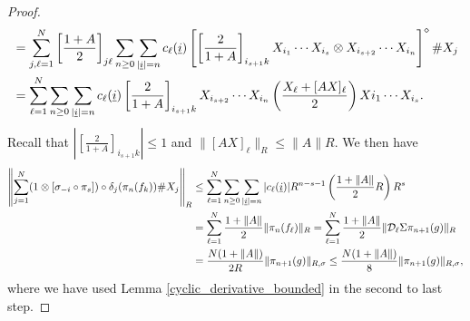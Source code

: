 \begin{proof}
\begin{align*}
			&=\sum_{j,\ell=1}^N \left[\frac{1+A}{2}\right]_{j\ell}\sum_{n\geq 0} \sum_{|\underline{i}|=n} c_\ell(\underline{i}) \left[ \left[\frac{2}{1+A}\right]_{i_{s+1}k}X_{i_1}\cdots X_{i_s}\otimes X_{i_{s+2}}\cdots X_{i_n}\right]^\diamond\# X_j\\
			&=\sum_{\ell=1}^N \sum_{n\geq 0} \sum_{|\underline{i}|=n} c_\ell(\underline{i}) \left[\frac{2}{1+A}\right]_{i_{s+1}k}X_{i_{s+2}}\cdots X_{i_n}\left(\frac{X_\ell+[AX]_{\ell}}{2}\right)X{i_1}\cdots X_{i_s}.
	\end{align*}
Recall that $\left|\left[\frac{2}{1+A}\right]_{i_{s+1}k}\right|\leq 1$ and $\|[AX]_\ell\|_R\leq \|A\| R$. We then have
	\begin{align*}
		\left\|\sum_{j=1}^N (1\otimes[\sigma_{-i}\circ\pi_s])\circ\delta_j(\pi_n(f_k))\# X_j\right\|_R &\leq \sum_{\ell=1}^N \sum_{n\geq 0} \sum_{|\underline{i}|=n} |c_\ell(\underline{i})| R^{n-s-1}\left(\frac{1+\|A\|}{2} R\right)R^s\\
			&=\sum_{\ell=1}^N \frac{1+\|A\|}{2} \|\pi_n(f_\ell)\|_R =\sum_{\ell=1}^N \frac{1+\|A\|}{2} \|\mathcal D_\ell \Sigma \pi_{n+1}(g)\|_R\\
			&= \frac{N(1+\|A\|)}{2R} \|\pi_{n+1}(g)\|_{R,\sigma} \leq \frac{N(1+\|A\|)}{8}\|\pi_{n+1}(g)\|_{R,\sigma},
	\end{align*}
where we have used Lemma \ref{cyclic_derivative_bounded} in the second to last step.


\end{proof}
